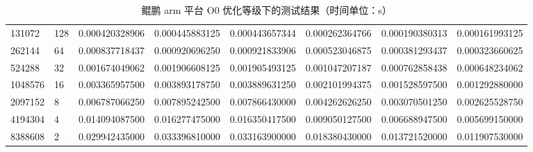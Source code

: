 \documentclass[a4paper]{article}
\begin{document}
\begin{table}[]
{\begin{tabular}{llllllll}
      131072  & 128     & 0.000420328906 & 0.000445883125  & 0.000443657344 & 0.000262364766 & 0.000190380313 & 0.000161993125 \\
      262144  & 64      & 0.000837718437 & 0.000920696250  & 0.000921833906 & 0.000523046875 & 0.000381293437 & 0.000323660625 \\
      524288  & 32      & 0.001674049062 & 0.001906608125  & 0.001905493125 & 0.001047207187 & 0.000762858438 & 0.000648234062 \\
      1048576 & 16      & 0.003365957500 & 0.003893178750  & 0.003889631250 & 0.002101994375 & 0.001528597500 & 0.001292880000 \\
      2097152 & 8       & 0.006787066250 & 0.007895242500  & 0.007866430000 & 0.004262626250 & 0.003070501250 & 0.002625528750 \\
      4194304 & 4       & 0.014094087500 & 0.016277475000  & 0.016350417500 & 0.009050127500 & 0.006688947500 & 0.005699150000 \\
      8388608 & 2       & 0.029942435000 & 0.033396810000  & 0.033163900000 & 0.018380430000 & 0.013721520000 & 0.011907530000
    \end{tabular}%
  }
  \caption{鲲鹏 arm 平台 O0 优化等级下的测试结果（时间单位：s）}
  \label{tab:arm-O0-test}
\end{table}
\end{document}
